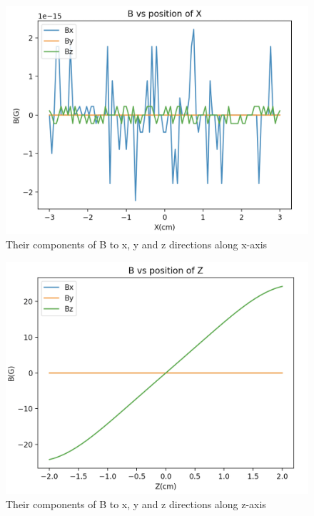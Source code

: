 \documentclass{article}
\begin{document}
\begin{figure}[h]
	\centering
	\includegraphics[scale=0.45]{MOTBx}
	\caption{Their components of B to x, y and z directions along x-axis}
\end{figure}

\begin{figure}[h]
	\centering
	\includegraphics[scale=0.45]{MOTBz}
	\caption{Their components of B to x, y and z directions along z-axis}
\end{figure}
\end{document}
